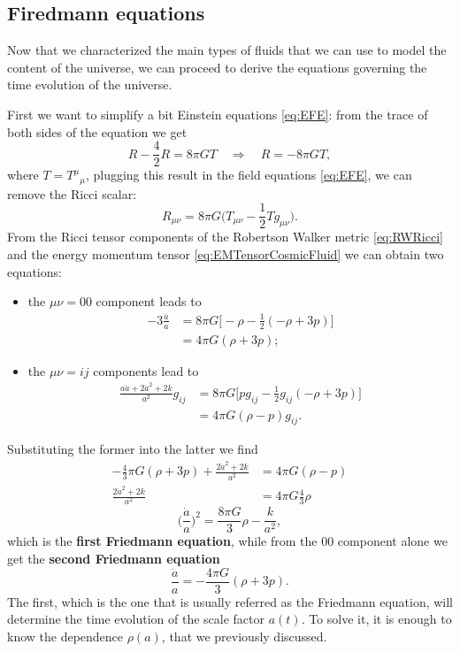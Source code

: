 \subsection{Firedmann equations}
Now that we characterized the main types of fluids that we can use to model the content of the universe, we can proceed to derive the equations governing the time evolution of the universe.

First we want to simplify a bit Einstein equations \eqref{eq:EFE}: from the trace of both sides of the equation we get
\begin{equation*}
    R-\frac{4}{2}R=8\pi GT\quad\Rightarrow\quad R=-8\pi GT,
\end{equation*}
where $T=T^\mu\phantom{}_\mu$, plugging this result in the field equations \eqref{eq:EFE}, we can remove the Ricci scalar:\begin{equation*}
    R_{\mu\nu}=8\pi G\bigg(T_{\mu\nu}-\frac{1}{2}Tg_{\mu\nu}\bigg).
\end{equation*}
From the Ricci tensor components of the Robertson Walker metric \eqref{eq:RWRicci} and the energy momentum tensor \eqref{eq:EMTensorCosmicFluid} we can obtain two equations:
\begin{itemize}
    \item the $\mu\nu=00$ component leads to
    \begin{align*}
        -3\frac{\ddot a}{a}&=8\pi G\bigg[-\rho-\frac{1}{2}(-\rho+3p)\bigg]\\&=4\pi G(\rho+3p);
    \end{align*}
    \item the $\mu\nu=ij$ components lead to
    \begin{align*}
        \frac{a\ddot a+2\dot a^2+2k}{a^2}g_{ij}&=8\pi G\bigg[pg_{ij}-\frac{1}{2}g_{ij}(-\rho+3p)\bigg]\\&=4\pi G(\rho-p)g_{ij}.
    \end{align*}
\end{itemize}
Substituting the former into the latter we find
\begin{align}
   -\frac{4}{3}\pi G(\rho+3p) +\frac{2\dot a^2+2k}{a^2}&=4\pi G(\rho-p)\nonumber\\\frac{2\dot a^2+2k}{a^2}&=4\pi G\frac{4}{3}\rho\nonumber
\end{align}
\begin{equation}
    \boxed{\bigg(\frac{\dot a }{a}\bigg)^2=\frac{8\pi G}{3}\rho-\frac{k}{a^2}}\label{eq:Friedmann1},
\end{equation}
which is the \textbf{first Friedmann equation}, while from the $00$ component alone we get the \textbf{second Friedmann equation}
\begin{equation}
    \label{eq:Friedmann2}\boxed{\frac{\ddot a}{a}=-\frac{4\pi G}{3}(\rho+3p)}.
\end{equation}
The first, which is the one that is usually referred as the Friedmann equation, will determine the time evolution of the scale factor $a(t)$. To solve it, it is enough to know the dependence $\rho(a)$, that we previously discussed.
